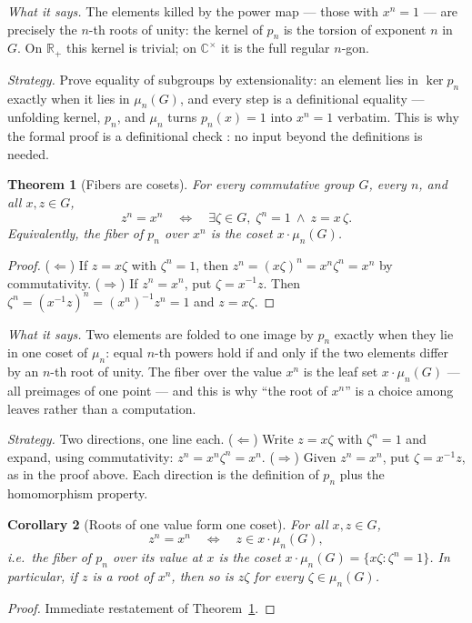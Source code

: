 \documentclass[submission,noinfoline]{jsfds}
\newtheorem{theorem}{Theorem}
\newtheorem{corollary}[theorem]{Corollary}
\newcommand{\Lean}[1]{}
\begin{document}
\textit{What it says.} The elements killed by the power map --- those
with $x^n=1$ --- are precisely the $n$-th roots of unity: the kernel of
$p_n$ is the torsion of exponent $n$ in $G$. On $\mathbb R_+$ this
kernel is trivial; on $\mathbb C^\times$ it is the full regular
$n$-gon.

\textit{Strategy.} Prove equality of subgroups by extensionality: an
element lies in $\ker p_n$ exactly when it lies in $\mu_n(G)$, and every
step is a definitional equality --- unfolding kernel, $p_n$, and
$\mu_n$ turns $p_n(x)=1$ into $x^n=1$ verbatim. This is why the formal
proof is a definitional check \Lean{powMap\_ker\_eq\_nRoots}: no input
beyond the definitions is needed.

\begin{theorem}[Fibers are cosets]\label{thm:fiber}
For every commutative group $G$, every $n$, and all $x,z\in G$,
\[
  z^n=x^n \quad\Longleftrightarrow\quad \exists \zeta\in G,\;
  \zeta^n=1\ \wedge\ z=x\,\zeta .
\]
Equivalently, the fiber of $p_n$ over $x^n$ is the coset
$x\cdot\mu_n(G)$.
\end{theorem}
\begin{proof}
($\Leftarrow$) If $z=x\zeta$ with $\zeta^n=1$, then
$z^n=(x\zeta)^n=x^n\zeta^n=x^n$ by commutativity.
($\Rightarrow$) If $z^n=x^n$, put $\zeta=x^{-1}z$. Then
$\zeta^n=(x^{-1}z)^n=(x^n)^{-1}z^n=1$ and $z=x\zeta$.
\Lean{powMap\_fiber\_iff}
\end{proof}

\textit{What it says.} Two elements are folded to one image by $p_n$
exactly when they lie in one coset of $\mu_n$: equal $n$-th powers hold
if and only if the two elements differ by an $n$-th root of unity. The
fiber over the value $x^n$ is the leaf set $x\cdot\mu_n(G)$ --- all
preimages of one point --- and this is why ``the root of $x^n$'' is a
choice among leaves rather than a computation.

\textit{Strategy.} Two directions, one line each. ($\Leftarrow$) Write
$z=x\zeta$ with $\zeta^n=1$ and expand, using commutativity:
$z^n=x^n\zeta^n=x^n$. ($\Rightarrow$) Given $z^n=x^n$, put
$\zeta=x^{-1}z$, as in the proof above. Each direction is the definition
of $p_n$ plus the homomorphism property.

\begin{corollary}[Roots of one value form one coset]\label{cor:rootset-coset}
For all $x,z\in G$,
\[
  z^n=x^n \quad\Longleftrightarrow\quad z\in x\cdot\mu_n(G),
\]
i.e.\ the fiber of $p_n$ over its value at $x$ is the coset
$x\cdot\mu_n(G)=\{x\zeta:\zeta^n=1\}$. In particular, if $z$ is a root
of $x^n$, then so is $z\zeta$ for every $\zeta\in\mu_n(G)$.
\end{corollary}
\begin{proof}
Immediate restatement of Theorem~\ref{thm:fiber}.
\end{proof}
\end{document}
